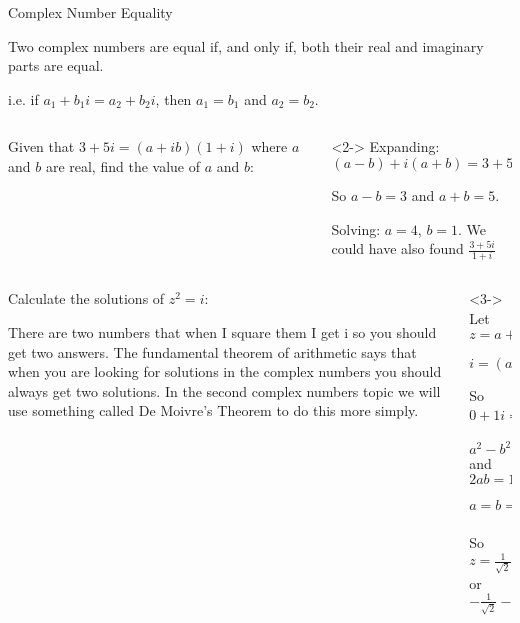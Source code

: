 \documentclass[8pt]{beamer}
\begin{document}
	\begin{frame}[shrink=10]{Complex Number Equality}
	    \begin{definition}
	        Two complex numbers are equal if, and only if, both their real and imaginary parts are equal.
	        
	        i.e. if $a_1+b_1i = a_2+b_2i$, then $a_1=b_1$ and $a_2=b_2$.
	    \end{definition}
    \begin{columns}[T]
	    \begin{column}{.3\linewidth}
	    \begin{problem}
	        Given that $3+5i=(a+ib)(1+i)$ where $a$ and $b$ are real, find the value of $a$ and $b$:
	    \end{problem}
	    \end{column}
    \begin{column}{.7\linewidth}
	    \begin{solution}<2->
	        Expanding: $(a-b)+i(a+b)=3+5i$
	        
            So $a-b=3$ and $a+b=5$.
            
            Solving: $a=4$, $b=1$. We could have also found $\frac{3+5i}{1+i}$
	    \end{solution}
    \end{column}
    \end{columns}
	    \begin{columns}[T]
	    	\begin{column}{.5\linewidth}
	    \begin{problem}
	        Calculate the solutions of $z^2=i$:
	    \end{problem}
	    
        \alert<1>{There are two numbers that when I square them I get i so you should get two answers. The fundamental theorem of arithmetic says that when you are looking for solutions in the complex numbers you should always get two solutions.}
        	    \alert<1>{In the second complex numbers topic we will use something called De Moivre’s Theorem to do this more simply.}
        \end{column}
    \begin{column}{.5\linewidth}
	    \begin{solution}<3->
	        Let $z=a+ib$
	        
            $i=(a+ib)^2=a^2+2abi-b^2$
            
            So $0+1i=(a^2-b^2 )+(2ab)i $
            
            $a^2-b^2=0$ and $2ab=1$
            
            $a=b=\pm \frac{1}{\sqrt{2}}$
            
            So $z=\frac{1}{\sqrt{2}}+\frac{1}{\sqrt{2}}i$ or $-\frac{1}{\sqrt{2}}-\frac{1}{\sqrt{2}}i$
	    \end{solution}
	    

	\end{column}
\end{columns}
	\end{frame}
	
\end{document}
